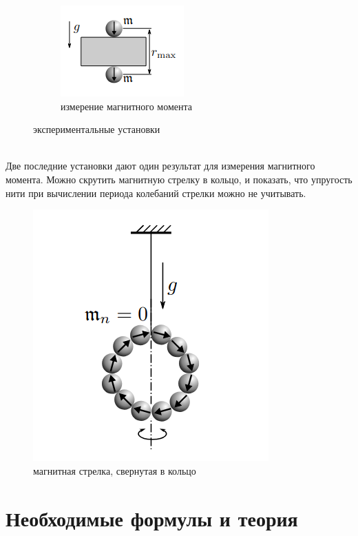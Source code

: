 \documentclass[a4paper, 12pt]{article}
\begin{document}
\begin{figure}[htbp]
\begin{subfigure}{0.2\textwidth}
            \includegraphics[width=\linewidth]{p3.png}
            \caption{измерение магнитного момента}
            \label{магнитный момент установка}
        \end{subfigure}
        \caption{экспериментальные установки}
        \label{установки}
    \end{figure}\\
Две последние установки дают один результат для измерения магнитного момента. Можно скрутить магнитную стрелку в кольцо, и
показать, что упругость нити при вычислении периода колебаний стрелки можно не учитывать.
\begin{figure}[htbp]
    \centering
    \includegraphics[width=0.3\linewidth]{p4.png}
    \caption{магнитная стрелка, свернутая в кольцо}
    \label{магнитная стрелка, свернутая в кольцо}
\end{figure}
\section*{Необходимые формулы и теория}
\end{document}
